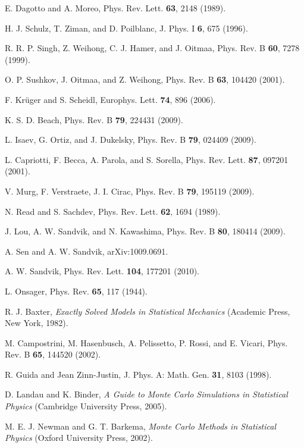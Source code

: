 \documentclass[draft,numberedheadings]{aipproc}
\begin{document}
\begin{thebibliography}{999}
E. Dagotto and A. Moreo, Phys. Rev. Lett. \textbf{63}, 2148 (1989).

H. J. Schulz, T. Ziman, and D. Poilblanc, J. Phys. I \textbf{6}, 675 (1996).

R. R. P. Singh, Z. Weihong, C. J. Hamer, and J. Oitmaa,
Phys. Rev. B {\bf 60}, 7278 (1999).

O. P. Sushkov, J. Oitmaa, and Z. Weihong, Phys. Rev. B {\bf 63}, 104420 (2001).

F. Kr\"uger and S. Scheidl, Europhys. Lett. {\bf 74}, 896 (2006).

K. S. D. Beach, Phys. Rev. B {\bf 79}, 224431 (2009).

L. Isaev, G. Ortiz, and J. Dukelsky, Phys. Rev. B {\bf 79}, 024409 (2009).

L. Capriotti, F. Becca, A. Parola, and S. Sorella, Phys. Rev. Lett. {\bf 87}, 097201 (2001).

V. Murg, F. Verstraete, J. I. Cirac, Phys. Rev. B {\bf 79}, 195119 (2009).

N. Read and S. Sachdev, Phys. Rev. Lett. {\bf 62}, 1694  (1989).

J. Lou, A. W. Sandvik, and N. Kawashima, Phys. Rev. B {\bf 80}, 180414 (2009).

A. Sen and A. W. Sandvik, arXiv:1009.0691.

A. W. Sandvik, Phys. Rev. Lett. {\bf 104}, 177201 (2010).

L. Onsager, Phys. Rev. {\bf 65}, 117 (1944).

R. J. Baxter, {\it Exactly Solved Models in Statistical Mechanics} (Academic Press, New York, 1982).

M. Campostrini, M. Hasenbusch, A. Pelissetto, P. Rossi, and E. Vicari,
Phys. Rev. B {\bf 65}, 144520 (2002).

R. Guida and Jean Zinn-Justin, J. Phys. A: Math. Gen. {\bf 31}, 8103 (1998).

D. Landau and K. Binder, {\it A Guide to Monte Carlo Simulations in Statistical
Physics} (Cambridge University Press, 2005).

M. E. J. Newman and G. T. Barkema, 
{\it Monte Carlo Methods in Statistical Physics} (Oxford University Press, 2002).


\end{thebibliography}
\end{document}
